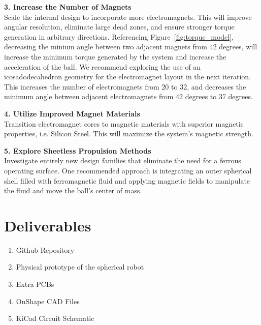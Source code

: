 \documentclass[11pt]{article}
\begin{document}
\vspace{1em}
\noindent \textbf{3. Increase the Number of Magnets}\\
Scale the internal design to incorporate more electromagnets. This will improve angular resolution, eliminate large dead zones, and ensure stronger torque generation in arbitrary directions. Referencing Figure~\ref{fig:torque_model}, decreasing the minium angle between two adjacent magnets from 42 degrees, will
increase the minimum torque generated by the system and increase the acceleration of the ball. We recommend exploring the use of an icosadodecahedron geometry for the electromagnet layout in the next iteration. This increases the number of electromagnets from 20 to 32, and decreases the minimum angle between adjacent electromagnets from 42 degrees to 37 degrees.

\vspace{1em}
\noindent \textbf{4. Utilize Improved Magnet Materials}\\
Transition electromagnet cores to magnetic materials with superior magnetic properties, i.e. Silicon Steel. This will maximize the system's magnetic strength.

\vspace{1em}
\noindent \textbf{5. Explore Sheetless Propulsion Methods}\\
Investigate entirely new design families that eliminate the need for a ferrous operating surface. One recommended approach is integrating an outer spherical shell filled with ferromagnetic fluid and applying magnetic fields to manipulate the fluid and move the ball's center of mass.

\section{Deliverables}
\begin{enumerate}
    \item Github Repository
    \item Physical prototype of the spherical robot
    \item Extra PCBs
    \item OnShape CAD Files
    \item KiCad Circuit Schematic
\end{enumerate}
\end{document}
